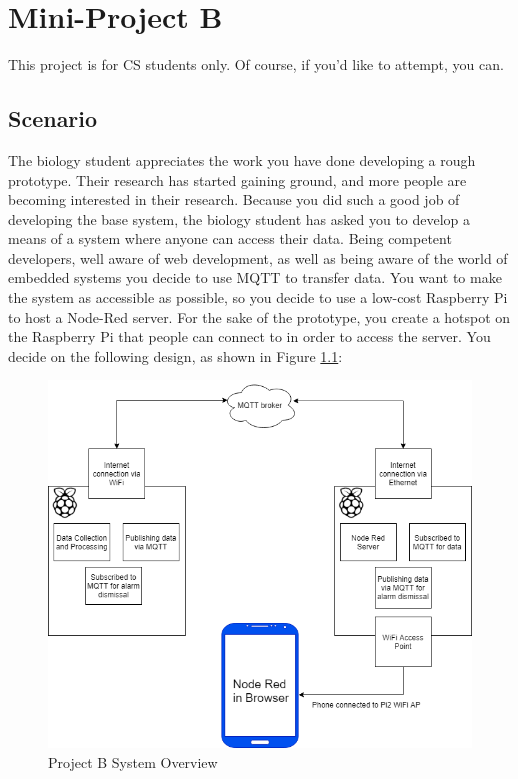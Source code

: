\chapter{Mini-Project B}
This project is for CS students only. Of course, if you'd like to attempt, you can.\\

\section{Scenario}
The biology student appreciates the work you have done developing a rough prototype. Their research has started gaining ground, and more people are becoming interested in their research. Because you did such a good job of developing the base system, the biology student has asked you to develop a means of a system where anyone can access their data. Being competent developers, well aware of web development, as well as being aware of the world of embedded systems you decide to use MQTT to transfer data. You want to make the system as accessible as possible, so you decide to use a low-cost Raspberry Pi to host a Node-Red server. For the sake of the prototype, you create a hotspot on the Raspberry Pi that people can connect to in order to access the server. You decide on the following design, as shown in Figure \ref{fig:NodeRed}:

\begin{figure}[H]
\centering
\includegraphics[width=1\columnwidth]{Figures/NodeRed}
\caption{Project B System Overview}
\label{fig:NodeRed}
\end{figure}

